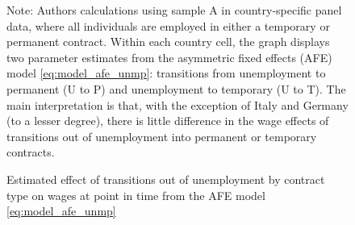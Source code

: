 \begin{figure}
    \caption{Estimated effect of transitions out of unemployment by contract type on wages at point in time from the AFE model \ref{eq:model_afe_unmp}}
    \label{graph_unmp}
    \footnotesize{Note: Authors calculations using sample A in country-specific panel data, where all individuals are employed in either a temporary or permanent contract.  Within each country cell, the graph displays two parameter estimates from the asymmetric fixed effects (AFE) model \ref{eq:model_afe_unmp}: transitions from unemployment to permanent (U to P) and unemployment to temporary (U to T).  The main interpretation is that, with the exception of Italy and Germany (to a lesser degree), there is little difference in the wage effects of transitions out of unemployment into permanent or temporary contracts.}
\end{figure}

